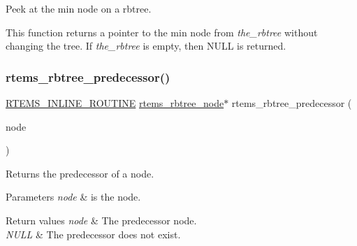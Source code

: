 Peek at the min node on a rbtree. 

This function returns a pointer to the min node from {\itshape the\+\_\+rbtree} without changing the tree. If {\itshape the\+\_\+rbtree} is empty, then N\+U\+LL is returned. \mbox{\label{group__ClassicRBTrees_ga6f94273d178c81396125dd3e35b0584e}} 
\subsubsection{\texorpdfstring{rtems\_rbtree\_predecessor()}{rtems\_rbtree\_predecessor()}}
{\footnotesize\ttfamily \mbox{\hyperlink{group__RTEMSScoreBaseDefs_gac216239df231d5dbd15e3520b0b9313f}{R\+T\+E\+M\+S\+\_\+\+I\+N\+L\+I\+N\+E\+\_\+\+R\+O\+U\+T\+I\+NE}} \mbox{\hyperlink{group__ClassicRBTrees_gaef47fc7fc61856c9afbf7f18a26ff80d}{rtems\+\_\+rbtree\+\_\+node}}$\ast$ rtems\+\_\+rbtree\+\_\+predecessor (\begin{DoxyParamCaption}\item[{const \mbox{\hyperlink{group__ClassicRBTrees_gaef47fc7fc61856c9afbf7f18a26ff80d}{rtems\+\_\+rbtree\+\_\+node}} $\ast$}]{node }\end{DoxyParamCaption})}



Returns the predecessor of a node. 


\begin{DoxyParams}{Parameters}
{\em node} & is the node.\\
\hline
\end{DoxyParams}

\begin{DoxyRetVals}{Return values}
{\em node} & The predecessor node. \\
\hline
{\em N\+U\+LL} & The predecessor does not exist. \\
\hline
\end{DoxyRetVals}
\mbox{\label{group__ClassicRBTrees_gaf3348775c30f53b13e2ddb1c14f039bf}} 
